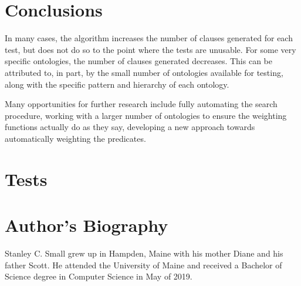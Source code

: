\documentclass{article}
\begin{document}
	\section{Conclusions}

In many cases, the algorithm increases the number of clauses generated for each test, but does not do so to the point where the tests are unusable. For some very specific ontologies, the number of clauses generated decreases. This can be attributed to, in part, by the small number of ontologies available for testing, along with the specific pattern and hierarchy of each ontology. 

Many opportunities for further research include fully automating the search procedure, working with a larger number of ontologies to ensure the weighting functions actually do as they say, developing a new approach towards automatically weighting the predicates. 
	\nocite{*}
	\newpage
	\printbibliography

	\newpage
	\appendix

	\section{Tests}

	\newpage
	\section*{Author's Biography}
Stanley C. Small grew up in Hampden, Maine with his mother Diane and his father Scott. He attended the University of Maine and received a Bachelor of Science degree in Computer Science in May of 2019. 
\end{document}

